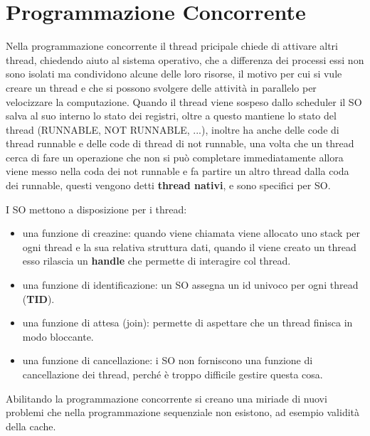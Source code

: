 \documentclass[12pt]{article}
\begin{document}
\section{Programmazione Concorrente}
Nella programmazione concorrente il thread pricipale chiede di attivare altri thread, chiedendo aiuto al sistema operativo, che a differenza dei processi essi non sono isolati ma condividono alcune delle loro risorse, il motivo per cui si vule creare un thread e che si possono svolgere delle attivit\`a in parallelo per velocizzare la computazione. Quando il thread viene sospeso dallo scheduler il SO salva al suo interno lo stato dei registri, oltre a questo mantiene lo stato del thread (RUNNABLE, NOT RUNNABLE, ...), inoltre ha anche delle code di thread runnable e delle code di thread di not runnable, una volta che un thread cerca di fare un operazione che non si pu\`o completare immediatamente allora viene messo nella coda dei not runnable e fa partire un altro thread dalla coda dei runnable, questi vengono detti \textbf{thread nativi}, e sono specifici per SO.

I SO mettono a disposizione per i thread:
\begin{itemize}
  \item una funzione di creazine: quando viene chiamata viene allocato uno stack per ogni thread e la sua relativa struttura dati, quando il viene creato un thread esso rilascia un \textbf{handle} che permette di interagire col thread.
  \item una funzione di identificazione: un SO assegna un id univoco per ogni thread (\textbf{TID}).
  \item una funzione di attesa (join): permette di aspettare che un thread finisca in modo bloccante.
  \item una funzione di cancellazione: i SO non forniscono una funzione di cancellazione dei thread, perch\'e \`e troppo difficile gestire questa cosa.
\end{itemize}
Abilitando la programmazione concorrente si creano una miriade di nuovi problemi che nella programmazione sequenziale non esistono, ad esempio validit\`a della cache.
\end{document}
